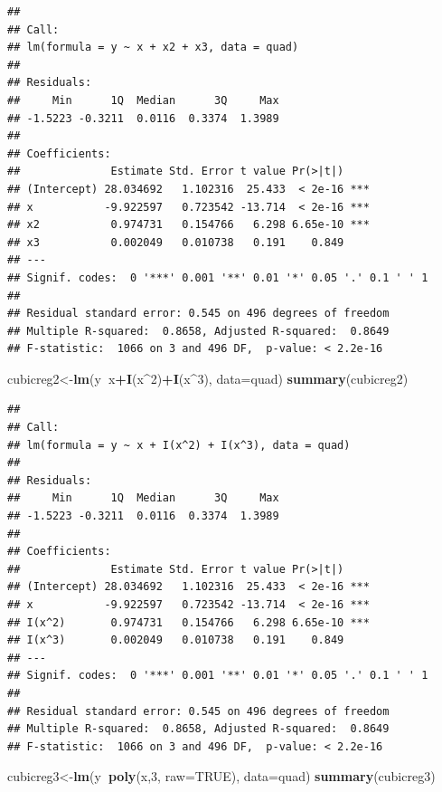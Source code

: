 \documentclass[]{book}
\newenvironment{Shaded}{\begin{snugshade}}{\end{snugshade}}
\newcommand{\KeywordTok}[1]{\textcolor[rgb]{0.13,0.29,0.53}{\textbf{#1}}}
\newcommand{\DataTypeTok}[1]{\textcolor[rgb]{0.13,0.29,0.53}{#1}}
\newcommand{\DecValTok}[1]{\textcolor[rgb]{0.00,0.00,0.81}{#1}}
\newcommand{\OtherTok}[1]{\textcolor[rgb]{0.56,0.35,0.01}{#1}}
\newcommand{\OperatorTok}[1]{\textcolor[rgb]{0.81,0.36,0.00}{\textbf{#1}}}
\newcommand{\NormalTok}[1]{#1}
\theoremstyle{definition}
\theoremstyle{definition}
\theoremstyle{definition}
\theoremstyle{remark}
\begin{document}
\begin{verbatim}
## 
## Call:
## lm(formula = y ~ x + x2 + x3, data = quad)
## 
## Residuals:
##     Min      1Q  Median      3Q     Max 
## -1.5223 -0.3211  0.0116  0.3374  1.3989 
## 
## Coefficients:
##              Estimate Std. Error t value Pr(>|t|)    
## (Intercept) 28.034692   1.102316  25.433  < 2e-16 ***
## x           -9.922597   0.723542 -13.714  < 2e-16 ***
## x2           0.974731   0.154766   6.298 6.65e-10 ***
## x3           0.002049   0.010738   0.191    0.849    
## ---
## Signif. codes:  0 '***' 0.001 '**' 0.01 '*' 0.05 '.' 0.1 ' ' 1
## 
## Residual standard error: 0.545 on 496 degrees of freedom
## Multiple R-squared:  0.8658, Adjusted R-squared:  0.8649 
## F-statistic:  1066 on 3 and 496 DF,  p-value: < 2.2e-16
\end{verbatim}

\begin{Shaded}
\begin{Highlighting}[]
\NormalTok{cubicreg2<-}\KeywordTok{lm}\NormalTok{(y}\OperatorTok{~}\NormalTok{x}\OperatorTok{+}\KeywordTok{I}\NormalTok{(x}\OperatorTok{^}\DecValTok{2}\NormalTok{)}\OperatorTok{+}\KeywordTok{I}\NormalTok{(x}\OperatorTok{^}\DecValTok{3}\NormalTok{), }\DataTypeTok{data=}\NormalTok{quad)}
\KeywordTok{summary}\NormalTok{(cubicreg2)}
\end{Highlighting}
\end{Shaded}

\begin{verbatim}
## 
## Call:
## lm(formula = y ~ x + I(x^2) + I(x^3), data = quad)
## 
## Residuals:
##     Min      1Q  Median      3Q     Max 
## -1.5223 -0.3211  0.0116  0.3374  1.3989 
## 
## Coefficients:
##              Estimate Std. Error t value Pr(>|t|)    
## (Intercept) 28.034692   1.102316  25.433  < 2e-16 ***
## x           -9.922597   0.723542 -13.714  < 2e-16 ***
## I(x^2)       0.974731   0.154766   6.298 6.65e-10 ***
## I(x^3)       0.002049   0.010738   0.191    0.849    
## ---
## Signif. codes:  0 '***' 0.001 '**' 0.01 '*' 0.05 '.' 0.1 ' ' 1
## 
## Residual standard error: 0.545 on 496 degrees of freedom
## Multiple R-squared:  0.8658, Adjusted R-squared:  0.8649 
## F-statistic:  1066 on 3 and 496 DF,  p-value: < 2.2e-16
\end{verbatim}

\begin{Shaded}
\begin{Highlighting}[]
\NormalTok{cubicreg3<-}\KeywordTok{lm}\NormalTok{(y}\OperatorTok{~}\KeywordTok{poly}\NormalTok{(x,}\DecValTok{3}\NormalTok{, }\DataTypeTok{raw=}\OtherTok{TRUE}\NormalTok{), }\DataTypeTok{data=}\NormalTok{quad)}
\KeywordTok{summary}\NormalTok{(cubicreg3)}
\end{Highlighting}
\end{Shaded}
\end{document}
